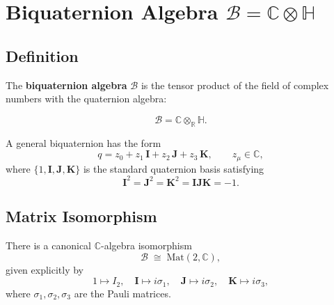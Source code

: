 %
%


\section{Biquaternion Algebra $\mathcal{B} = \mathbb{C}\otimes\mathbb{H}$}
\label{sec:algebra:biquaternion_algebra}

\subsection{Definition}

The \textbf{biquaternion algebra} $\mathcal{B}$ is the tensor product of the field
of complex numbers with the quaternion algebra:

\begin{equation}
  \label{eq:biquat_def}
  \mathcal{B} = \mathbb{C} \otimes_{\mathbb{R}} \mathbb{H}.
\end{equation}

A general biquaternion has the form
\begin{equation}
  \label{eq:biquat_general}
  q = z_0 + z_1\,\mathbf{I} + z_2\,\mathbf{J} + z_3\,\mathbf{K},
  \qquad z_\mu \in \mathbb{C},
\end{equation}
where $\{1, \mathbf{I}, \mathbf{J}, \mathbf{K}\}$ is the standard quaternion basis
satisfying
\begin{equation}
  \label{eq:quat_rules}
  \mathbf{I}^2 = \mathbf{J}^2 = \mathbf{K}^2 = \mathbf{I}\mathbf{J}\mathbf{K} = -1.
\end{equation}

\subsection{Matrix Isomorphism}

There is a canonical $\mathbb{C}$-algebra isomorphism
\begin{equation}
  \label{eq:biquat_iso}
  \mathcal{B} \;\cong\; \mathrm{Mat}(2, \mathbb{C}),
\end{equation}
given explicitly by
\begin{equation}
  1 \mapsto I_2, \quad
  \mathbf{I} \mapsto i\sigma_1, \quad
  \mathbf{J} \mapsto i\sigma_2, \quad
  \mathbf{K} \mapsto i\sigma_3,
\end{equation}
where $\sigma_1, \sigma_2, \sigma_3$ are the Pauli matrices.

